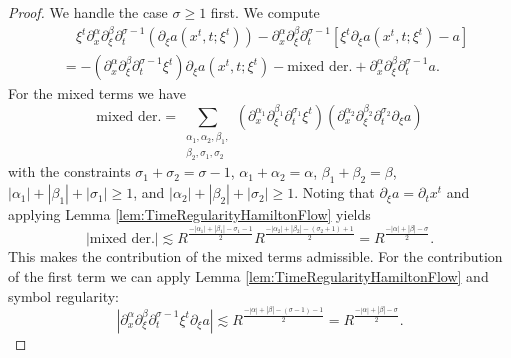 \documentclass{amsart}
\theoremstyle{definition}
\begin{document}
\begin{proof}
We handle the case $\sigma \geq 1$ first. We compute
\begin{equation*}
\begin{split}
&\quad \xi^t \partial_x^{\alpha} \partial_{\xi}^{\beta} \partial_t^{\sigma -1 } (\partial_{\xi} a(x^t,t;\xi^t)) - \partial_x^{\alpha} \partial_{\xi}^{\beta} \partial_t^{\sigma -1 } [ \xi^t \partial_{\xi} a(x^t,t;\xi^t) - a ] \\
&= - (\partial_x^{\alpha} \partial_{\xi}^{\beta} \partial_t^{\sigma - 1} \xi^t) \partial_{\xi} a(x^t,t;\xi^t) - \text{mixed der.} + \partial_x^{\alpha} \partial_{\xi}^{\beta} \partial_t^{\sigma - 1} a.
\end{split}
\end{equation*}
For the mixed terms we have
\begin{equation*}
\text{mixed der.} = \sum_{\substack{\alpha_1,\alpha_2, \beta_1, \\ \beta_2, \sigma_1, \sigma_2 }} (\partial_x^{\alpha_1} \partial_{\xi}^{\beta_1} \partial_t^{\sigma_1} \xi^t) (\partial_x^{\alpha_2} \partial_{\xi}^{\beta_2} \partial_t^{\sigma_2} \partial_{\xi} a)
\end{equation*}
with the constraints $\sigma_1 + \sigma_2 = \sigma - 1$, $\alpha_1 + \alpha_2 = \alpha$, $\beta_1 + \beta_2 = \beta$, $|\alpha_1|+|\beta_1|+|\sigma_1| \geq 1$, and $|\alpha_2|+|\beta_2|+|\sigma_2| \geq 1$. Noting that $\partial_{\xi} a = \partial_t x^t$ and applying Lemma \ref{lem:TimeRegularityHamiltonFlow} yields
\begin{equation*}
|\text{mixed der.}| \lesssim R^{\frac{-|\alpha_1|+|\beta_1|-\sigma_1 - 1}{2}} R^{\frac{- |\alpha_2| + |\beta_2| - (\sigma_2+1)+1}{2}} = R^{\frac{-|\alpha|+|\beta|-\sigma}{2}}.
\end{equation*}
This makes the contribution of the mixed terms admissible.
For the contribution of the first term we can apply Lemma \ref{lem:TimeRegularityHamiltonFlow} and symbol regularity:
\begin{equation*}
|\partial_x^{\alpha} \partial_{\xi}^{\beta} \partial_t^{\sigma - 1} \xi^t \partial_{\xi} a| \lesssim R^{\frac{-|\alpha|+|\beta|-(\sigma -1) -1}{2}} = R^{\frac{-|\alpha|+|\beta|-\sigma}{2}}.
\end{equation*}


\end{proof}
\end{document}

